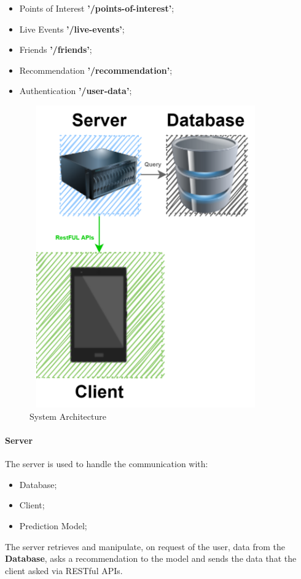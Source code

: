 \documentclass[../../main]{subfiles}
\begin{document}
\begin{itemize}
    \item Points of Interest \textbf{'/points-of-interest'};
    \item Live Events \textbf{'/live-events'};
    \item Friends \textbf{'/friends'};
    \item Recommendation \textbf{'/recommendation'};

    \item Authentication \textbf{'/user-data'};

\end{itemize}
    \begin{figure}[h]
        \centering
        \includegraphics[width=100mm,height=130mm]{images/simple.png}
        \caption{System Architecture}\label{fig:system_architecture}
    \end{figure}

\paragraph*{Server}
The server is used to handle the communication with:
\begin{itemize}
    \item Database;
    \item Client;
    \item Prediction Model;
\end{itemize}
The server retrieves and manipulate, on request of the user, data from the \textbf{Database}, 
asks a recommendation to the model and sends the data that the client asked via RESTful APIs.
\end{document}
